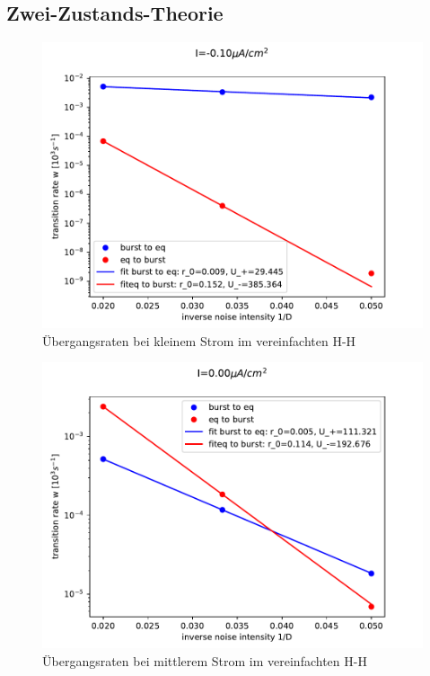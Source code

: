 \documentclass[12pt,a4paper]{article}
\begin{document}
\subsection{Zwei-Zustands-Theorie}
\begin{figure}[H]
	\centering
	\includegraphics[scale=1]{arrheniustotrealrinzel25onewrealfast19jjem2stfit0.pdf}\caption{Übergangsraten bei kleinem Strom im vereinfachten H-H}
	\label{arrhrinzel1}
\end{figure}
\begin{figure}[H]
	\centering
	\includegraphics[scale=1]{arrheniustotrealrinzel25onewrealfast19jjem2stfit5.pdf}\caption{Übergangsraten bei mittlerem Strom im vereinfachten H-H}
	\label{arrhrinzel2}
\end{figure}
\end{document}
